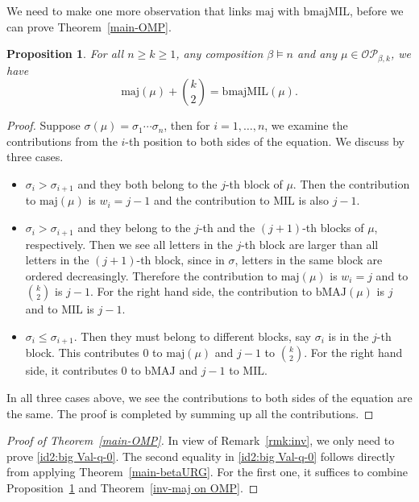 \documentclass[12pt]{amsart}
\numberwithin{equation}{section}
\theoremstyle{plain}
\newtheorem{proposition}[theorem]{Proposition}
\theoremstyle{definition}
\def\MIL{\mathrm{MIL}}
\def\bMAJ{\mathrm{bMAJ}}
\def\bmajMIL{\mathrm{bmajMIL}}
\def\maj{\mathrm{maj}}
\def\OP{\mathcal{OP}}
\begin{document}
We need to make one more observation that links $\maj$ with $\bmajMIL$, before we can prove Theorem~\ref{main-OMP}.
\begin{proposition}\label{maj-bmajMIL}
For all $n\ge k\ge 1$, any composition $\beta\models n$ and any $\mu\in\OP_{\beta,k}$, we have $$\maj(\mu)+\binom{k}{2}=\bmajMIL(\mu).$$
\end{proposition}
\begin{proof}
Suppose $\sigma(\mu)=\sigma_1\cdots\sigma_n$, then for $i=1,\ldots,n$, we examine the contributions from the $i$-th position to both sides of the equation. We discuss by three cases.
\begin{itemize}
	\item $\sigma_i>\sigma_{i+1}$ and they both belong to the $j$-th block of $\mu$. Then the contribution to $\maj(\mu)$ is $w_i=j-1$ and the contribution to $\MIL$ is also $j-1$.
	\item $\sigma_i>\sigma_{i+1}$ and they belong to the $j$-th and the $(j+1)$-th blocks of $\mu$, respectively. Then we see all letters in the $j$-th block are larger than all letters in the $(j+1)$-th block, since in $\sigma$, letters in the same block are ordered decreasingly. Therefore the contribution to $\maj(\mu)$ is $w_i=j$ and to $\binom{k}{2}$ is $j-1$. For the right hand side, the contribution to $\bMAJ(\mu)$ is $j$ and to $\MIL$ is $j-1$.
	\item $\sigma_i\le\sigma_{i+1}$. Then they must belong to different blocks, say $\sigma_i$ is in the $j$-th block. This contributes $0$ to $\maj(\mu)$ and $j-1$ to $\binom{k}{2}$. For the right hand side, it contributes $0$ to $\bMAJ$ and $j-1$ to $\MIL$.
\end{itemize}
In all three cases above, we see the contributions to both sides of the equation are the same. The proof is completed by summing up all the contributions.
\end{proof}

\begin{proof}[Proof of Theorem~\ref{main-OMP}]
In view of Remark~\ref{rmk:inv}, we only need to prove \eqref{id2:big Val-q-0}. The second equality in \eqref{id2:big Val-q-0} follows directly from applying Theorem~\ref{main-betaURG}. For the first one, it suffices to combine Proposition~\ref{maj-bmajMIL} and Theorem~\ref{inv-maj on OMP}.
\end{proof}

\end{document}
